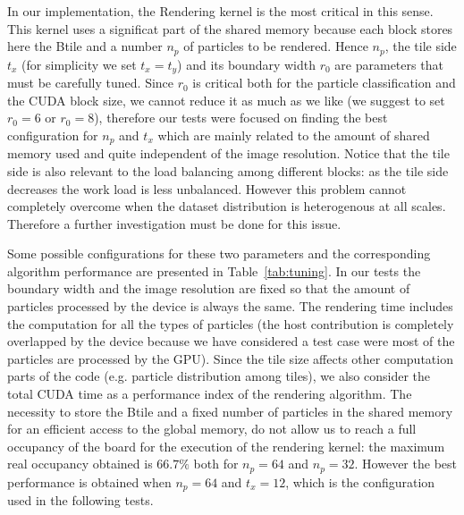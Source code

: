 \documentclass[11pt]{article}
\begin{document}
In our implementation, the Rendering kernel is the most critical in this sense. This kernel uses a significat part of the shared memory because each block stores here the Btile and a number $n_p$ of particles to be rendered. 
Hence $n_p$, the tile side $t_x$ (for simplicity we set $t_x=t_y$) and its boundary width $r_0$ are parameters that must be carefully tuned. 
Since $r_0$ is critical both for the particle classification and the CUDA block size, we cannot reduce it as much as we like (we suggest to set $r_0=6$ or $r_0=8$), therefore our tests were focused on finding the best configuration for $n_p$ and $t_x$ which are mainly related to the amount of shared memory used and quite independent of the image resolution. Notice that the tile side is also relevant to the load balancing among different blocks: as the tile side decreases the work load is less unbalanced. However this problem cannot completely overcome when the dataset distribution is heterogenous at all scales. Therefore a further investigation must be done for this issue.

Some possible configurations for these two parameters and the corresponding algorithm performance are presented in Table~\ref{tab:tuning}. In our tests the boundary width and the image resolution are fixed so that the amount of particles processed by the device is always the same. The rendering time includes the computation for all the types of particles (the host contribution is completely overlapped by the device because we have considered a test case were most of the particles are processed by the GPU). Since the tile size affects other computation parts of the code (e.g. particle distribution among tiles), we also consider the total CUDA time as a performance index of the rendering algorithm. 
The necessity to store the Btile and a fixed number of particles in the shared memory for an efficient access to the global memory, do not allow us to reach a full occupancy of the board for the execution of the rendering kernel: the maximum real occupancy obtained is $66.7\%$ both for $n_p = 64$ and $n_p=32$. However the best performance is obtained when $n_p=64$ and $t_x = 12$, which is the configuration used in the following tests.
\end{document}

